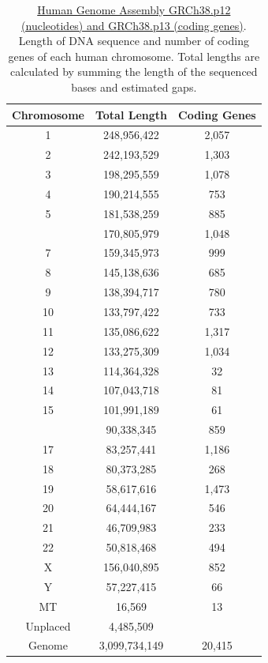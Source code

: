\begin{table}[!h]

\caption{\label{tab:humanchromosomes}\href{https://www.ncbi.nlm.nih.gov/grc/human/data}{Human Genome Assembly GRCh38.p12 (nucleotides) and GRCh38.p13 (coding genes)}. Length of DNA sequence and number of coding genes of each human chromosome. Total lengths are calculated by summing the length of the sequenced bases and estimated gaps.}
\centering
\begin{tabular}[t]{ccc}
\toprule
Chromosome & Total Length & Coding Genes\\
\midrule
\rowcolor{gray!6}  1 & 248,956,422 & 2,057\\
2 & 242,193,529 & 1,303\\
\rowcolor{gray!6}  3 & 198,295,559 & 1,078\\
4 & 190,214,555 & 753\\
\rowcolor{gray!6}  5 & 181,538,259 & 885\\
\addlinespace
6 & 170,805,979 & 1,048\\
\rowcolor{gray!6}  7 & 159,345,973 & 999\\
8 & 145,138,636 & 685\\
\rowcolor{gray!6}  9 & 138,394,717 & 780\\
10 & 133,797,422 & 733\\
\addlinespace
\rowcolor{gray!6}  11 & 135,086,622 & 1,317\\
12 & 133,275,309 & 1,034\\
\rowcolor{gray!6}  13 & 114,364,328 & 32\\
14 & 107,043,718 & 81\\
\rowcolor{gray!6}  15 & 101,991,189 & 61\\
\addlinespace
16 & 90,338,345 & 859\\
\rowcolor{gray!6}  17 & 83,257,441 & 1,186\\
18 & 80,373,285 & 268\\
\rowcolor{gray!6}  19 & 58,617,616 & 1,473\\
20 & 64,444,167 & 546\\
\addlinespace
\rowcolor{gray!6}  21 & 46,709,983 & 233\\
22 & 50,818,468 & 494\\
\rowcolor{gray!6}  X & 156,040,895 & 852\\
Y & 57,227,415 & 66\\
\rowcolor{gray!6}  MT & 16,569 & 13\\
\addlinespace
Unplaced & 4,485,509 & \\
\rowcolor{gray!6}  Genome & 3,099,734,149 & 20,415\\
\bottomrule
\end{tabular}
\end{table}


